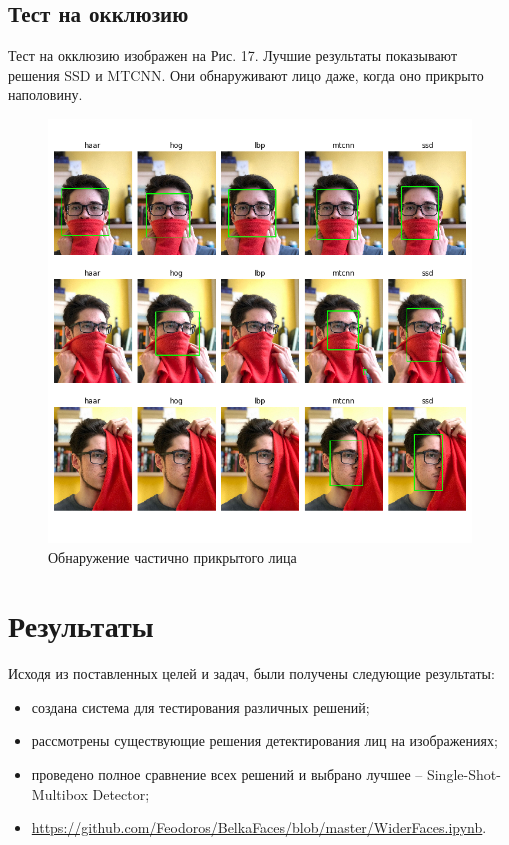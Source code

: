 \documentclass[14pt]{matmex-diploma-custom}
\begin{document}
        \subsection{Тест на окклюзию}
        Тест на окклюзию изображен на Рис. 17. Лучшие результаты показывают решения SSD и MTCNN. Они обнаруживают лицо даже, когда оно прикрыто наполовину.
        \begin{figure}[H]
                        \centering
                        \includegraphics[width=1\textwidth]{images/scarf_test.png}
                        \caption{Обнаружение частично прикрытого лица}
       \end{figure}
        
 \newpage
 \section{Результаты}
    Исходя из поставленных целей и задач, были получены следующие результаты:
    \begin{itemize}
        \item создана система для тестирования различных решений;
        \item рассмотрены существующие решения детектирования лиц на изображениях;
        \item проведено полное сравнение всех решений и выбрано лучшее -- Single-Shot-Multibox Detector;
        \item \url {https://github.com/Feodoros/BelkaFaces/blob/master/WiderFaces.ipynb}.
    \end{itemize}
\newpage
\setmonofont[Mapping=tex-text]{CMU Typewriter Text}


\end{document}
